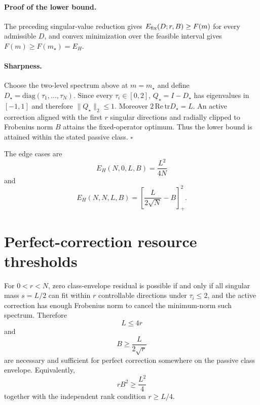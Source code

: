 \documentclass[aps,pra,onecolumn,superscriptaddress,nofootinbib]{revtex4-2}
\begin{document}
\paragraph{Proof of the lower bound.}
The preceding singular-value reduction gives $E_{\rm fix}(D;r,B)\ge F(m)$ for every admissible $D$, and convex minimization over the feasible interval gives $F(m)\ge F(m_\star)=E_H$.

\paragraph{Sharpness.}
Choose the two-level spectrum above at $m=m_\star$ and define $D_\star=\mathrm{diag}(\tau_1,\ldots,\tau_N)$. Since every $\tau_i\in[0,2]$, $Q_\star=I-D_\star$ has eigenvalues in $[-1,1]$ and therefore $\|Q_\star\|_2\le1$. Moreover $2\,\mathrm{Re}\,\mathrm{tr}D_\star=L$. An active correction aligned with the first $r$ singular directions and radially clipped to Frobenius norm $B$ attains the fixed-operator optimum. Thus the lower bound is attained within the stated passive class. $\square$

The edge cases are
\begin{equation}
\boxed{E_H(N,0,L,B)=\frac{L^2}{4N}}
\end{equation}
and
\begin{equation}
\boxed{E_H(N,N,L,B)=\left[\frac{L}{2\sqrt N}-B\right]_+^2.}
\end{equation}

\section{Perfect-correction resource thresholds}
For $0<r<N$, zero class-envelope residual is possible if and only if all singular mass $s=L/2$ can fit within $r$ controllable directions under $\tau_i\le2$, and the active correction has enough Frobenius norm to cancel the minimum-norm such spectrum. Therefore
\begin{equation}
\boxed{L\le4r}
\end{equation}
and
\begin{equation}
\boxed{B\ge\frac{L}{2\sqrt r}}
\end{equation}
are necessary and sufficient for perfect correction somewhere on the passive class envelope. Equivalently,
\begin{equation}
\boxed{rB^2\ge\frac{L^2}{4}}
\end{equation}
together with the independent rank condition $r\ge L/4$.
\end{document}
